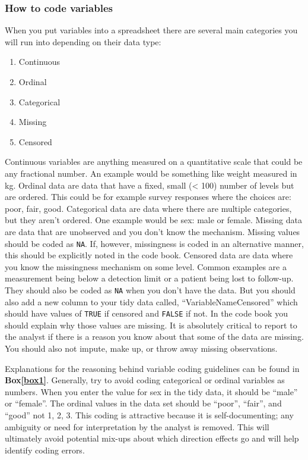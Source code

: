 \documentclass[12pt]{article}
\providecommand{\tightlist}{%
  \setlength{\itemsep}{0pt}\setlength{\parskip}{0pt}}
\begin{document}
\subsubsection{How to code variables}\label{how-to-code-variables}

When you put variables into a spreadsheet there are several main
categories you will run into depending on their data type:

\begin{enumerate}
\def\labelenumi{\arabic{enumi}.}
\tightlist
\item
  Continuous
\item
  Ordinal
\item
  Categorical
\item
  Missing
\item
  Censored
\end{enumerate}

Continuous variables are anything measured on a quantitative scale that
could be any fractional number. An example would be something like
weight measured in kg. Ordinal data are data that have a fixed, small
(\textless{} 100) number of levels but are ordered. This could be for
example survey responses where the choices are: poor, fair, good.
Categorical data are data where there are multiple categories, but they
aren't ordered. One example would be sex: male or female. Missing data
are data that are unobserved and you don't know the mechanism. Missing
values should be coded as \texttt{NA}. If, however, missingness is coded
in an alternative manner, this should be explicitly noted in the code
book. Censored data are data where you know the missingness mechanism on
some level. Common examples are a measurement being below a detection
limit or a patient being lost to follow-up. They should also be coded as
\texttt{NA} when you don't have the data. But you should also add a new
column to your tidy data called, ``VariableNameCensored'' which should
have values of \texttt{TRUE} if censored and \texttt{FALSE} if not. In
the code book you should explain why those values are missing. It is
absolutely critical to report to the analyst if there is a reason you
know about that some of the data are missing. You should also not
impute, make up, or throw away missing observations.

Explanations for the reasoning behind variable coding guidelines can be
found in \textbf{Box\ref{box1}}. Generally, try to avoid coding
categorical or ordinal variables as numbers. When you enter the value
for sex in the tidy data, it should be ``male'' or ``female''. The
ordinal values in the data set should be ``poor'', ``fair'', and
``good'' not 1, 2, 3. This coding is attractive because it is
self-documenting; any ambiguity or need for interpretation by the
analyst is removed. This will ultimately avoid potential mix-ups about
which direction effects go and will help identify coding errors.
\end{document}
